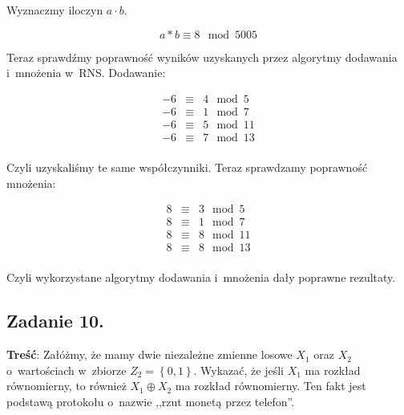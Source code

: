 \documentclass[a4paper,10pt, twocolumn]{article}
\begin{document}
\noindent Wyznaczmy iloczyn $a \cdot b$.

\begin{equation*}
 a * b \equiv 8 \mod 5005
\end{equation*}

\noindent Teraz sprawdźmy poprawność wyników uzyskanych przez algorytmy dodawania i~mnożenia w~RNS. Dodawanie:

\begin{equation*}
 \begin{array}{lcl} -6 & \equiv & 4 \mod 5 \\
 -6 & \equiv & 1 \mod 7 \\
 -6 & \equiv & 5 \mod 11 \\
 -6 & \equiv & 7 \mod 13\\
 \end{array}
\end{equation*}

\noindent Czyli uzyskaliśmy te same współczynniki. Teraz sprawdzamy poprawność mnożenia:

\begin{equation*}
 \begin{array}{lcl} 8 & \equiv & 3 \mod 5 \\
 8 & \equiv & 1 \mod 7 \\
 8 & \equiv & 8 \mod 11 \\
 8 & \equiv & 8 \mod 13 \\
 \end{array}
\end{equation*}

\noindent Czyli wykorzystane algorytmy dodawania i~mnożenia dały poprawne rezultaty.

\subsection{Zadanie 10.}
\label{subsec:KolZadanie10}

\textbf{Treść}: Załóżmy, że mamy dwie niezależne zmienne losowe $X_{1}$ oraz $X_{2}$ o~wartościach w~zbiorze $Z_{2} = \left\{0, 1\right\}$. Wykazać, że jeśli $X_{1}$ ma rozkład równomierny, to również $X_{1} \oplus X_{2}$ ma rozkład równomierny. Ten fakt jest podstawą protokołu o~nazwie ,,rzut monetą przez telefon''.
\end{document}

